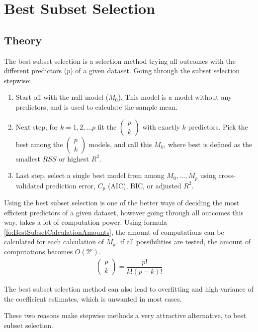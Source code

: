\section{Best Subset Selection}
\subsection{Theory}
The best subset selection is a selection method trying all outcomes with the different predictors ($p$) of a given dataset. Going through the subset selection stepwise:
\begin{enumerate}
	\item Start off with the null model ($M_0$). This model is a model without any predictors, and is used to calculate the sample mean. 
	\item Next step, for $k = 1, 2, \dots p$ fit the $( \begin{smallmatrix} p \\ k \end{smallmatrix} )$ with exactly $k$ predictors. Pick the best among the $( \begin{smallmatrix} p \\ k \end{smallmatrix} )$ models, and call this $M_k$, where best is defined as the smallest $RSS$ or highest $R^2$.
	\item Last step, select a single best model from among $M_0,\dots,M_p$ using cross-validated prediction error, $C_p$ (AIC), BIC, or adjusted $R^2$.
\end{enumerate}
 
Using the best subset selection is one of the better ways of deciding the most efficient predictors of a given dataset, however going through all outcomes this way, takes a lot of computation power. Using formula \ref{fo:BestSubsetCalculationAmounts}, the amount of computations can be calculated for each calculation of $M_k$. if all possibilities are tested, the amount of computations becomes $O(2^p)$.
\begin{align}\label{fo:BestSubsetCalculationAmounts}
	\begin{pmatrix}
		p \\ k
	\end{pmatrix}
	= \dfrac{p!}{k!(p-k)!}
\end{align}

The best subset selection method can also lead to overfitting and high variance of the coefficient estimates, which is unwanted in most cases. 

These two reasons make stepwise methods a very attractive alternative, to best subset selection. 

